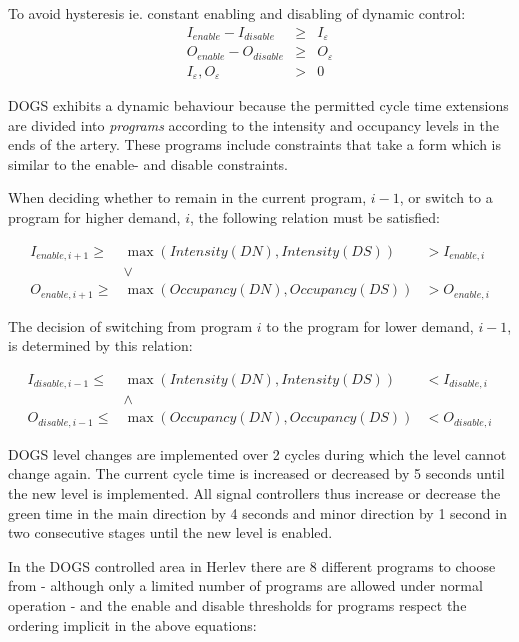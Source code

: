 To avoid hysteresis ie. constant enabling and disabling of dynamic control:
\begin{eqnarray}
I_{enable} - I_{disable} & \geq & I_{\varepsilon} \label{eqn:hysteresis_intensity} \\ 
O_{enable} - O_{disable} & \geq & O_{\varepsilon} \label{eqn:hysteresis_load} \\
I_{\varepsilon},O_{\varepsilon} & > & 0 \label{eqn:hysteresis_limits}
\label{eqn:hysteresis}
\end{eqnarray}

DOGS exhibits a dynamic behaviour because the permitted cycle time extensions are divided into \textit{programs} according to the intensity and occupancy levels in the ends of the artery. These programs include constraints that take a form which is similar to the enable- and disable constraints.

When deciding whether to remain in the current program, $i-1$, or switch to a program for higher demand, $i$, the following relation must be satisfied:

\begin{eqnarray*}
I_{enable,i+1} \geq & \max(Intensity(DN),Intensity(DS)) & > I_{enable,i} \\
& \vee & \\
O_{enable,i+1} \geq & \max(Occupancy(DN),Occupancy(DS))  & > O_{enable,i}
\end{eqnarray*}

The decision of switching from program $i$ to the program for lower demand, $i-1$, is determined by this relation:

\begin{eqnarray*}
I_{disable,i-1} \leq & \max(Intensity(DN),Intensity(DS)) & < I_{disable,i} \\
& \wedge & \\
O_{disable,i-1} \leq & \max(Occupancy(DN),Occupancy(DS))  & < O_{disable,i}
\end{eqnarray*}

DOGS level changes are implemented over 2 cycles during which the level cannot change again. The current cycle time is increased or decreased by 5 seconds until the new level is implemented. All signal controllers thus increase or decrease the green time in the main direction by 4 seconds and minor direction by 1 second in two consecutive stages until the new level is enabled.

In the DOGS controlled area in Herlev there are 8 different programs to choose from - although only a limited number of programs are allowed under normal operation - and the enable and disable thresholds for programs respect the ordering implicit in the above equations:

